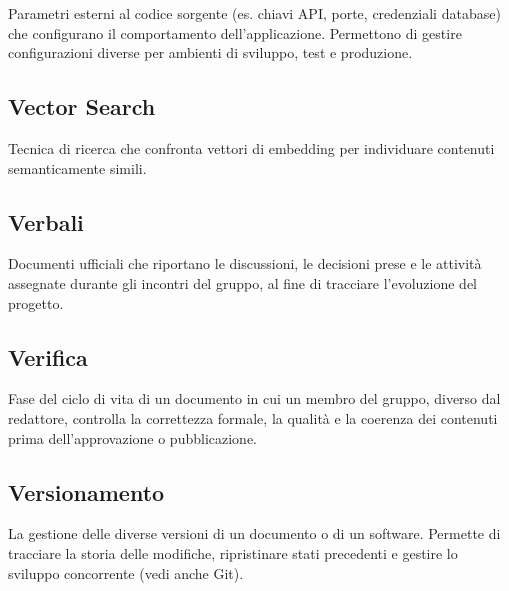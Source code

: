 \documentclass[a4paper, 11pt, oneside]{scrartcl} %
\begin{document}
Parametri esterni al codice sorgente (es. chiavi API, porte, credenziali database) che configurano il comportamento dell'applicazione. Permettono di gestire configurazioni diverse per ambienti di sviluppo, test e produzione.

\vspace{0.5cm}

\subsection*{Vector Search}
Tecnica di ricerca che confronta vettori di embedding per individuare contenuti semanticamente simili.
\vspace{0.5cm}

\subsection*{Verbali}


Documenti ufficiali che riportano le discussioni, le decisioni prese e le attività assegnate durante gli incontri del gruppo, al fine di tracciare l'evoluzione del progetto.

\vspace{0.5cm}

\subsection*{Verifica}


Fase del ciclo di vita di un documento in cui un membro del gruppo, diverso dal redattore, controlla la correttezza formale, la qualità e la coerenza dei contenuti prima dell'approvazione o pubblicazione.

\vspace{0.5cm}

\subsection*{Versionamento}
La gestione delle diverse versioni di un documento o di un software. Permette di tracciare la storia delle modifiche, ripristinare stati precedenti e gestire lo sviluppo concorrente (vedi anche Git).
\vspace{0.5cm}
\end{document}
